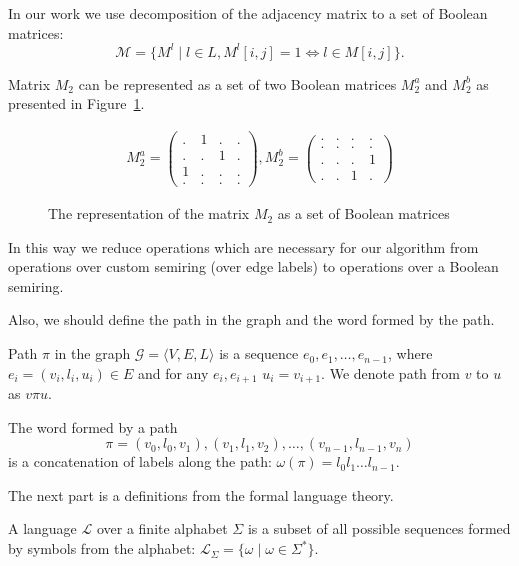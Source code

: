 In our work we use decomposition of the adjacency matrix to a set of Boolean matrices: 
$$
\mathcal{M} = \{M^l \mid l \in L, M^l[i,j]=1 \iff l \in M[i,j]\}.
$$

Matrix $M_2$ can be represented as a set of two Boolean matrices $M_2^a$ and $M_2^b$ as presented in Figure~\ref{fig:boolean_decomposition_of_graph}.

\begin{figure}[h]
	\centering
\begin{align}
M_2^{a} =
\begin{pmatrix}
    . & 1 & . & .   \\
    . & . & 1 & .   \\
    1 & . & . & .   \\
    . & . & . & .  
\end{pmatrix}, 
M_2^{b} =
\begin{pmatrix}      
    . & . & . & .   \\
    . & . & . & .   \\
    . & . & . & 1   \\
    . & . & 1 & . 
\end{pmatrix}
\end{align}
   \caption{The representation of the matrix $M_2$ as a set of Boolean matrices}
\label{fig:boolean_decomposition_of_graph}
\end{figure}

In this way we reduce operations which are necessary for our algorithm from operations over custom semiring (over edge labels) to operations over a Boolean semiring.

Also, we should define the path in the graph and the word formed by the path.

\begin{definition}
Path $\pi$ in the graph $\mathcal{G} = \langle V,E,L \rangle$ is a sequence $e_0,e_1,\ldots,e_{n-1}$, where $e_i = (v_i,l_i,u_i) \in E$ and for any $e_i, e_{i+1}$ $u_i = v_{i+1}$. We denote path from $v$ to $u$ as $v\pi u$.   
\end{definition}

\begin{definition}
The word formed by a path $$\pi = (v_0,l_0,v_1),(v_1,l_1,v_2),\ldots,(v_{n-1},l_{n-1},v_n)$$ is a concatenation of labels along the path: $\omega(\pi) = l_0 l_1 \ldots l_{n-1}$.
\end{definition}

The next part is a definitions from the formal language theory.
\begin{definition}
A language $\mathcal{L}$ over a finite alphabet $\Sigma$ is a subset of all possible sequences formed by symbols from the alphabet: $\mathcal{L}_{\Sigma} = \{\omega \mid \omega \in \Sigma^*\}$.
\end{definition}

